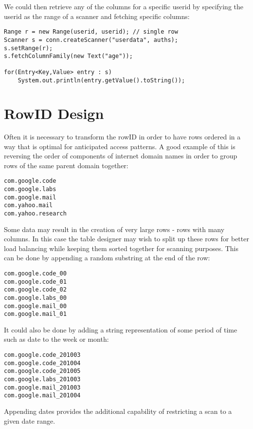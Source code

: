 We could then retrieve any of the columns for a specific userid by specifying the
userid as the range of a scanner and fetching specific columns:

\small
\begin{verbatim}
Range r = new Range(userid, userid); // single row
Scanner s = conn.createScanner("userdata", auths);
s.setRange(r);
s.fetchColumnFamily(new Text("age"));

for(Entry<Key,Value> entry : s)
    System.out.println(entry.getValue().toString());
\end{verbatim}
\normalsize

\section{RowID Design}

Often it is necessary to transform the rowID in order to have rows ordered in a way
that is optimal for anticipated access patterns. A good example of this is reversing
the order of components of internet domain names in order to group rows of the
same parent domain together:

\small
\begin{verbatim}
com.google.code
com.google.labs
com.google.mail
com.yahoo.mail
com.yahoo.research
\end{verbatim}
\normalsize

Some data may result in the creation of very large rows - rows with many columns.
In this case the table designer may wish to split up these rows for better load
balancing while keeping them sorted together for scanning purposes. This can be
done by appending a random substring at the end of the row:

\small
\begin{verbatim}
com.google.code_00
com.google.code_01
com.google.code_02
com.google.labs_00
com.google.mail_00
com.google.mail_01
\end{verbatim}
\normalsize

It could also be done by adding a string representation of some period of time such as date to the week
or month:

\small
\begin{verbatim}
com.google.code_201003
com.google.code_201004
com.google.code_201005
com.google.labs_201003
com.google.mail_201003
com.google.mail_201004
\end{verbatim}
\normalsize

Appending dates provides the additional capability of restricting a scan to a given
date range.

